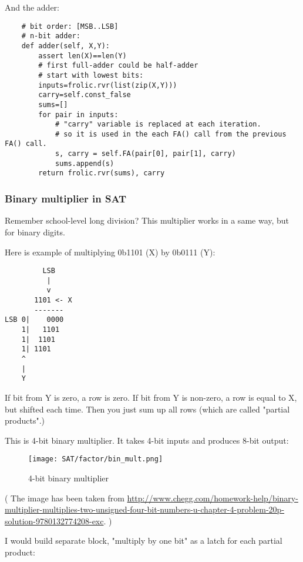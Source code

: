 And the adder:

\begin{lstlisting}
    # bit order: [MSB..LSB]
    # n-bit adder:
    def adder(self, X,Y):
        assert len(X)==len(Y)
        # first full-adder could be half-adder
        # start with lowest bits:
        inputs=frolic.rvr(list(zip(X,Y)))
        carry=self.const_false
        sums=[]
        for pair in inputs:
            # "carry" variable is replaced at each iteration.
            # so it is used in the each FA() call from the previous FA() call.
            s, carry = self.FA(pair[0], pair[1], carry)
            sums.append(s)
        return frolic.rvr(sums), carry
\end{lstlisting}

\subsubsection{Binary multiplier in SAT}

Remember school-level long division?
This multiplier works in a same way, but for binary digits.

Here is example of multiplying 0b1101 (X) by 0b0111 (Y):

\begin{lstlisting}
         LSB
          |
          v
       1101 <- X
       -------
LSB 0|    0000
    1|   1101
    1|  1101
    1| 1101
    ^
    |
    Y
\end{lstlisting}

If bit from Y is zero, a row is zero.
If bit from Y is non-zero, a row is equal to X, but shifted each time.
Then you just sum up all rows (which are called "partial products".)

This is 4-bit binary multiplier. It takes 4-bit inputs and produces 8-bit output:

\begin{figure}[H]
\centering
\texttt{[image: SAT/factor/bin\_mult.png]}
\caption{4-bit binary multiplier}
\end{figure}

( The image has been taken from \url{http://www.chegg.com/homework-help/binary-multiplier-multiplies-two-unsigned-four-bit-numbers-u-chapter-4-problem-20p-solution-9780132774208-exc}. )

I would build separate block, "multiply by one bit" as a latch for each partial product:

